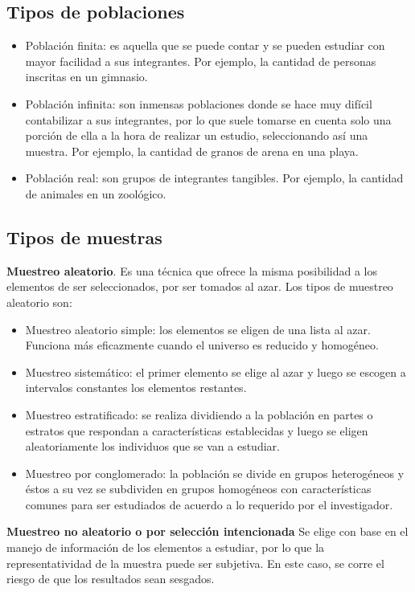 \subsection{Tipos de poblaciones}

\begin{itemize} 
    \item Población finita: es aquella que se puede contar y se pueden
estudiar con mayor facilidad a sus integrantes. Por ejemplo, la cantidad de
personas inscritas en un gimnasio. 
    \item Población infinita: son inmensas poblaciones
donde se hace muy difícil contabilizar a sus integrantes, por lo que suele
tomarse en cuenta solo una porción de ella a la hora de realizar un estudio,
seleccionando así una muestra. Por ejemplo, la cantidad de granos de arena en
una playa. 
    \item Población real: son grupos de integrantes tangibles. Por ejemplo, la
cantidad de animales en un zoológico.
\end{itemize}

\subsection{Tipos de muestras}

\textbf{Muestreo aleatorio}. Es una técnica que ofrece la misma posibilidad a los
elementos de ser seleccionados, por ser tomados al azar. Los tipos de muestreo
aleatorio son:

\begin{itemize}

    \item Muestreo aleatorio simple: los elementos se eligen de una lista al azar.
Funciona más eficazmente cuando el universo es reducido y homogéneo. 

\item Muestreo sistemático: el primer elemento se elige al azar y luego se
escogen a intervalos constantes los elementos restantes. 

\item Muestreo estratificado: se realiza dividiendo a la población en partes o
estratos que respondan a características establecidas y luego se eligen
aleatoriamente los individuos que se van a estudiar. 

\item Muestreo por conglomerado: la población se divide en grupos heterogéneos y
éstos a su vez se subdividen en grupos homogéneos con características comunes
para ser estudiados de acuerdo a lo requerido por el investigador.
\end{itemize}

\textbf{Muestreo no aleatorio o por selección intencionada} Se elige con
base en el manejo de información de los elementos a estudiar, por lo que la
representatividad de la muestra puede ser subjetiva. En este caso, se corre el
riesgo de que los resultados sean sesgados.


